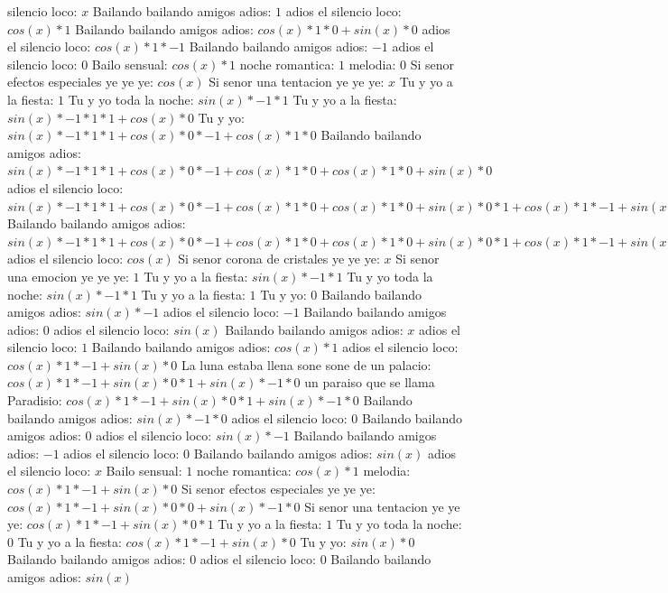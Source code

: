 \documentclass{article}
\begin{document}
silencio loco: $x$ Bailando bailando amigos adios: $1$  \newline adios el silencio loco: $cos(x)*1$ Bailando bailando amigos adios: $cos(x)*1*0+sin(x)*0$ adios el silencio loco: $cos(x)*1*-1$ Bailando bailando amigos adios: $-1$ adios el silencio loco: $0$  \newline Bailo sensual: $cos(x)*1$ noche romantica: $1$ melodia: $0$  \newline Si senor efectos especiales ye ye ye: $cos(x)$  \newline Si senor una tentacion ye ye ye: $x$ Tu y yo a la fiesta: $1$  \newline Tu y yo toda la noche: $sin(x)*-1*1$ Tu y yo a la fiesta: $sin(x)*-1*1*1+cos(x)*0$ Tu y yo: ${sin(x)*-1*1*1+cos(x)*0}*-1+cos(x)*1*0$ Bailando bailando amigos adios: ${sin(x)*-1*1*1+cos(x)*0}*-1+cos(x)*1*0+cos(x)*1*0+sin(x)*0$ adios el silencio loco: ${{sin(x)*-1*1*1+cos(x)*0}*-1+cos(x)*1*0+cos(x)*1*0+sin(x)*0}*1+{cos(x)*1*-1+sin(x)*0}*0$ Bailando bailando amigos adios: ${{sin(x)*-1*1*1+cos(x)*0}*-1+cos(x)*1*0+cos(x)*1*0+sin(x)*0}*1+{cos(x)*1*-1+sin(x)*0}*0+{cos(x)*1*-1+sin(x)*0}*0+sin(x)*-1*0$ adios el silencio loco: $cos(x)$  \newline Si senor corona de cristales ye ye ye: $x$ Si senor una emocion ye ye ye: $1$  \newline Tu y yo a la fiesta: $sin(x)*-1*1$ Tu y yo toda la noche: $sin(x)*-1*1$ Tu y yo a la fiesta: $1$ Tu y yo: $0$  \newline Bailando bailando amigos adios: $sin(x)*-1$ adios el silencio loco: $-1$ Bailando bailando amigos adios: $0$  \newline adios el silencio loco: $sin(x)$  \newline Bailando bailando amigos adios: $x$ adios el silencio loco: $1$  \newline Bailando bailando amigos adios: $cos(x)*1$ adios el silencio loco: $cos(x)*1*-1+sin(x)*0$ La luna estaba llena sone sone de un palacio: ${cos(x)*1*-1+sin(x)*0}*1+sin(x)*-1*0$ un paraiso que se llama Paradisio: ${cos(x)*1*-1+sin(x)*0}*1+sin(x)*-1*0$  \newline Bailando bailando amigos adios: $sin(x)*-1*0$ adios el silencio loco: $0$ Bailando bailando amigos adios: $0$  \newline adios el silencio loco: $sin(x)*-1$ Bailando bailando amigos adios: $-1$ adios el silencio loco: $0$  \newline Bailando bailando amigos adios: $sin(x)$  \newline adios el silencio loco: $x$ Bailo sensual: $1$  \newline noche romantica: $cos(x)*1$ melodia: $cos(x)*1*-1+sin(x)*0$ Si senor efectos especiales ye ye ye: ${cos(x)*1*-1+sin(x)*0}*0+sin(x)*-1*0$ Si senor una tentacion ye ye ye: ${cos(x)*1*-1+sin(x)*0}*1$ Tu y yo a la fiesta: $1$ Tu y yo toda la noche: $0$  \newline Tu y yo a la fiesta: $cos(x)*1*-1+sin(x)*0$  \newline Tu y yo: $sin(x)*0$ Bailando bailando amigos adios: $0$ adios el silencio loco: $0$  \newline Bailando bailando amigos adios: $sin(x)$  
\end{document}
